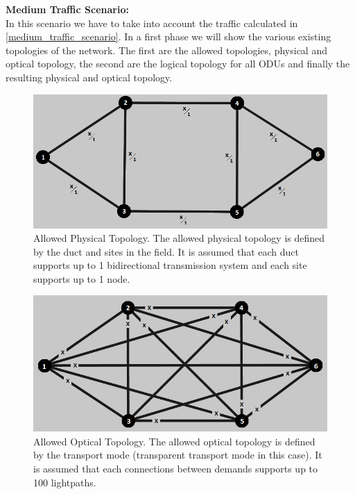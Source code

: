 \textbf{Medium Traffic Scenario:}\\

In this scenario we have to take into account the traffic calculated in \ref{medium_traffic_scenario}. In a first phase we will show the various existing topologies of the network. The first are the allowed topologies, physical and optical topology, the second are the logical topology for all ODUs and finally the resulting physical and optical topology.\\

\begin{figure}[H]
\centering
\includegraphics[width=13cm]{sdf/heuristic/transparent_protection/medium/allowed_physical_medium}
\caption{Allowed Physical Topology. The allowed physical topology is defined by the duct and sites in the field. It is assumed that each duct supports up to 1 bidirectional transmission system and each site supports up to 1 node.}
\label{allowed_physical_protection_ref_medium_heuristic_transparent}
\end{figure}

\begin{figure}[H]
\centering
\includegraphics[width=13cm]{sdf/heuristic/transparent_protection/medium/allowed_optical_medium}
\caption{Allowed Optical Topology. The allowed optical topology is defined by the transport mode (transparent transport mode in this case). It is assumed that each connections between demands supports up to 100 lightpaths.}
\label{allowed_optical_protection_ref_medium_heuristic_transparent}
\end{figure}

